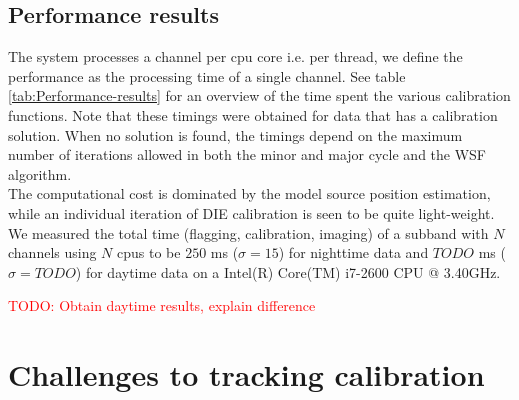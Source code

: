 \documentclass{aa}
\begin{document}
\subsection{Performance results}
The system processes a channel per cpu core i.e. per thread, we define the
performance as the processing time of a single channel. See table
\ref{tab:Performance-results} for an overview of the time spent the various
calibration functions. Note that these timings were obtained for data that has
a calibration solution. When no solution is found, the timings depend on the
maximum number of iterations allowed in both the minor and major cycle and the
WSF algorithm. \\
The computational cost is dominated by the model source position estimation,
while an individual iteration of DIE calibration is seen to be quite
light-weight. We measured the total time (flagging, calibration, imaging) of a
subband with $N$ channels using $N$ cpus to be $250$ ms ($\sigma = 15$) for
nighttime data and $TODO$ ms ($\sigma = TODO$) for daytime data on a Intel(R)
Core(TM) i7-2600 CPU @ 3.40GHz.
\begin{table}[tbh]

\caption{\label{tab:Performance-results} Overview of the time spent in
calibration function blocks for various datasets (daytime and nighttime). We
measured the overall time (flagging, calibrating, imaging) of an ACM to be
$250$ ms ($\sigma = 15$) for nighttime data and $1700$ ms ($\sigma 200$) for
daytime data using current generation hardware.}
\end{table}
\textcolor{red}{TODO: Obtain daytime results, explain difference}


\section{\label{sec:Challenges-to-tracking}Challenges to tracking calibration}
\end{document}
